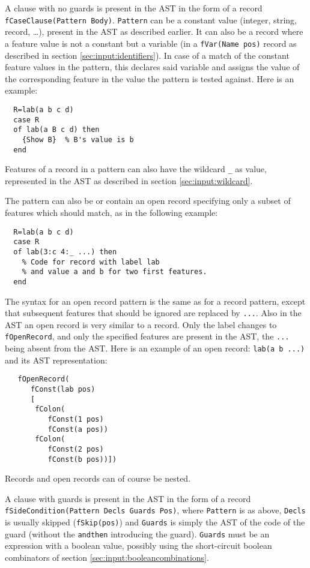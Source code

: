 \documentclass[a4paper]{memoir}
\begin{document}
A clause with no guards is present in the AST in the form of a record \lstinline!fCaseClause(Pattern Body)!. \lstinline!Pattern! can be a constant value (integer, string, record, \ldots), present in the AST as described earlier. It can also be a record where a feature value is not a constant but a variable (in a \lstinline!fVar(Name pos)! record as described in section \ref{sec:input:identifiers}). In case of a match of the constant feature values in the pattern, this declares said variable and assigns the value of the corresponding feature in the value the pattern is tested against. Here is an example:
\begin{lstlisting}
  R=lab(a b c d)
  case R
  of lab(a B c d) then
    {Show B}  % B's value is b
  end
\end{lstlisting}
Features of a record in a pattern can also have the wildcard \lstinline!_! as value, represented in the AST as described in section \ref{sec:input:wildcard}.

The pattern can also be or contain an open record specifying only a subset of features which should match, as in the following example:
\begin{lstlisting}
  R=lab(a b c d)
  case R
  of lab(3:c 4:_ ...) then
    % Code for record with label lab
    % and value a and b for two first features.
  end
\end{lstlisting}
The syntax for an open record pattern is the same as for a record pattern, except that subsequent features that should be ignored are replaced by \lstinline!...!. Also in the AST an open record is very similar to a record. Only the label changes to \lstinline!fOpenRecord!, and only the specified features are present in the AST, the \lstinline!...! being absent from the AST. Here is an example of an open record:
\lstinline!lab(a b ...)! 
and its AST representation:
\begin{lstlisting}
   fOpenRecord(
      fConst(lab pos)
      [
       fColon(
          fConst(1 pos)
          fConst(a pos))
       fColon(
          fConst(2 pos)
          fConst(b pos))])
\end{lstlisting}

Records and open records can of course be nested.

A clause with guards is present in the AST in the form of a record
\lstinline!fSideCondition(Pattern Decls Guards Pos)!, where \lstinline!Pattern!
is as above, \lstinline!Decls! is usually skipped
(\lstinline!fSkip(pos)!)%
and \lstinline!Guards! is simply the AST of the code of the guard (without the \lstinline!andthen! introducing the guard).
\lstinline!Guards! must be an expression with a boolean value, possibly using
the short-circuit boolean combinators of section \ref{sec:input:booleancombinations}.
\end{document}
